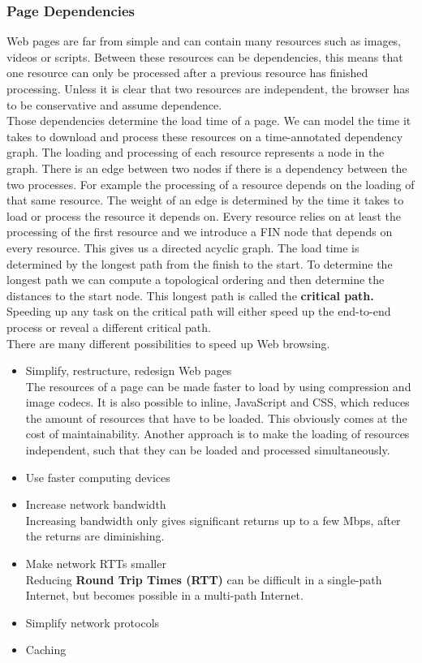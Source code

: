 \subsubsection{Page Dependencies}
Web pages are far from simple and can contain many resources such as images, videos or scripts. Between these resources can be dependencies, this means that one resource can only be processed after a previous resource has finished processing. Unless it is clear that two resources are independent, the browser has to be conservative and assume dependence. \\
Those dependencies determine the load time of a page. We can model the time it takes to download and process these resources on a time-annotated dependency graph. The loading and processing of each resource represents a node in the graph. There is an edge between two nodes if there is a dependency between the two processes. For example the processing of a resource depends on the loading of that same resource. The weight of an edge is determined by the time it takes to load or process the resource it depends on. Every resource relies on at least the processing of the first resource and we introduce a FIN node that depends on every resource. This gives us a directed acyclic graph. The load time is determined by the longest path from the finish to the start. To determine the longest path we can compute a topological ordering and then determine the distances to the start node. This longest path is called the \textbf{critical path.} Speeding up any task on the critical path will either speed up the end-to-end process or reveal a different critical path.\vspace{.3cm}\\

There are many different possibilities to speed up Web browsing.
\begin{itemize}
\item Simplify, restructure, redesign Web pages\\
The resources of a page can be made faster to load by using compression and image codecs. It is also possible to inline, JavaScript and CSS, which reduces the amount of resources that have to be loaded. This obviously comes at the cost of maintainability. Another approach is to make the loading of resources independent, such that they can be loaded and processed simultaneously.
\item Use faster computing devices
\item Increase network bandwidth\\
Increasing bandwidth only gives significant returns up to a few Mbps, after the returns are diminishing.
\item Make network RTTs smaller\\
Reducing \textbf{Round Trip Times (RTT)} can be difficult in a single-path Internet, but becomes possible in a multi-path Internet.
\item Simplify network protocols
\item Caching
\end{itemize}

